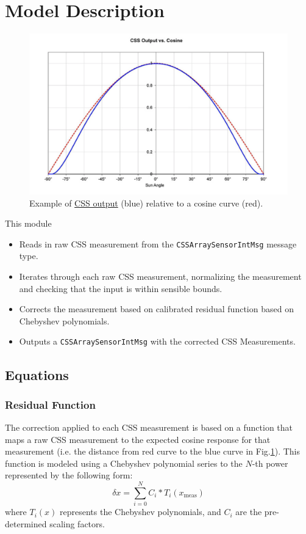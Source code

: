 
\section{Model Description}

\begin{figure}[H]
	\centerline{
		\includegraphics[scale=0.5]{Figures/CSSCalibration}
	}
	\caption{Example of \href{https://lang.adcole.com/aerospace/analog-sun-sensors/coarse-sun-sensor-detector/}{CSS output} (blue) relative to a cosine curve (red)\cite{CSS}.}
	\label{fig:CSSraw}
\end{figure}

This module 
\begin{itemize}
\item Reads in raw CSS measurement from the \verb.CSSArraySensorIntMsg. message type.
\item Iterates through each raw CSS measurement, normalizing the measurement and checking that the input is within sensible bounds.
\item Corrects the measurement based on calibrated residual function based on Chebyshev polynomials. 
\item Outputs a \verb.CSSArraySensorIntMsg. with the corrected CSS Measurements.
\end{itemize}


\subsection{Equations}
\subsubsection{Residual Function}
The correction applied to each CSS measurement is based on a function that maps a raw CSS measurement to the expected cosine response for that measurement (i.e. the distance from red curve to the blue curve in Fig.\ref{fig:CSSraw}). This function is modeled using a Chebyshev polynomial series to the $N$-th power represented by the following form: 
\begin{equation}
\delta x = \sum_{i=0}^{N} C_i*T_i(x_{\text{meas}})
\end{equation}
 where $T_i(x)$ represents the Chebyshev polynomials, and $C_i$ are the pre-determined scaling factors. 

